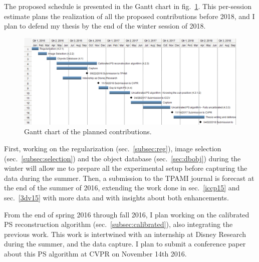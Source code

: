 \documentclass{report}
\begin{document}


The proposed schedule is presented in the Gantt chart in fig.~\ref{fig:schedule-gantt}. This per-session estimate plans the realization of all the proposed contributions before 2018, and I plan to defend my thesis by the end of the winter session of 2018.

\begin{figure}
\centering
\includegraphics[width=\linewidth]{schedule.png}
\caption{Gantt chart of the planned contributions.}
\label{fig:schedule-gantt}
\end{figure}


First, working on the regularization (sec.~\ref{subsec:reg}), image selection (sec.~\ref{subsec:selection}) and the object database (sec.~\ref{sec:dbobj}) during the winter will allow me to prepare all the experimental setup before capturing the data during the summer. Then, a submission to the TPAMI journal is forecast at the end of the summer of 2016, extending the work done in sec.~\ref{iccp15} and sec.~\ref{3dv15} with more data and with insights about both enhancements.

From the end of spring 2016 through fall 2016, I plan working on the calibrated PS reconstruction algorithm (sec.~\ref{subsec:calibrated}), also integrating the previous work. This work is intertwined with an internship at Disney Research during the summer, and the data capture. I plan to submit a conference paper about this PS algorithm at CVPR on November 14th 2016.
\end{document}
